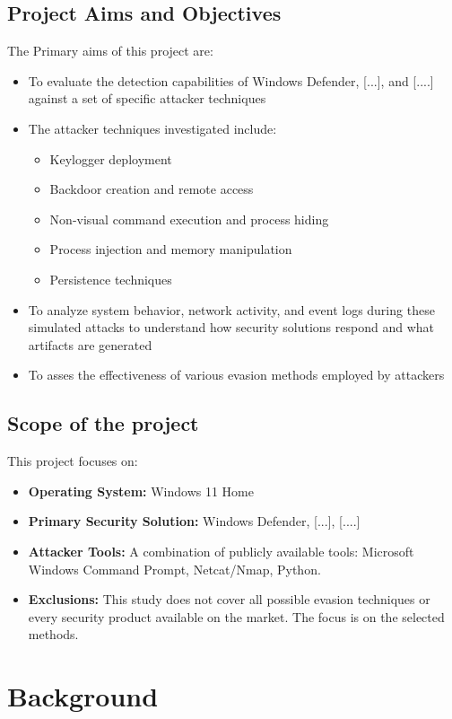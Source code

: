 \documentclass[11pt]{article}
\begin{document}
		\subsection{Project Aims and Objectives}
		The Primary aims of this project are:
		\begin{itemize}
			\item To evaluate the detection capabilities of Windows Defender, [...], and [....] against a set of specific attacker techniques
			\item The attacker techniques investigated include:
				\begin{itemize}
					\item Keylogger deployment
					\item Backdoor creation and remote access
					\item Non-visual command execution and process hiding
					\item Process injection and memory manipulation
					\item Persistence techniques
				\end{itemize}
			\item To analyze system behavior, network activity, and event logs during these simulated attacks to understand how security solutions respond and what artifacts are generated
			\item To asses the effectiveness of various evasion methods employed by attackers
		\end{itemize}
		\subsection{Scope of the project}
		This project focuses on:
		\begin{itemize}
			\item \textbf{Operating System:} Windows 11 Home
			\item \textbf{Primary Security Solution:} Windows Defender, [...], [....]
			\item \textbf{Attacker Tools:} A combination of publicly available tools: Microsoft Windows Command Prompt, Netcat/Nmap, Python.
			\item \textbf{Exclusions:} This study does not cover all possible evasion techniques or every security product available on the market. The focus is on the selected methods.
		\end{itemize}
		
		
		
		\section{Background}
\end{document}
